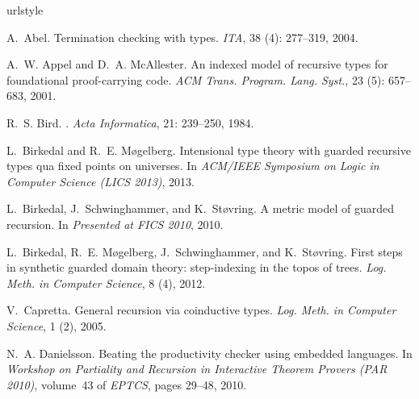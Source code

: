 \documentclass[natbib]{sigplanconf}
\begin{document}
\vfill\eject
\begin{thebibliography}{24}
\providecommand{\natexlab}[1]{#1}
\providecommand{\url}[1]{\texttt{#1}}
\expandafter\ifx\csname urlstyle\endcsname\relax
  \providecommand{\doi}[1]{doi: #1}\else
  \providecommand{\doi}{doi: \begingroup \urlstyle{rm}\Url}\fi

A.~Abel.
\newblock Termination checking with types.
\newblock \emph{ITA}, 38 (4): 277--319, 2004.

A.~W. Appel and D.~A. McAllester.
\newblock An indexed model of recursive types for foundational proof-carrying
  code.
\newblock \emph{ACM Trans. Program. Lang. Syst.}, 23 (5):
  657--683, 2001.

R.~S. Bird.
.
\newblock \emph{Acta Informatica}, 21: 239--250, 1984.

L.~Birkedal and R.~E. M{\o}gelberg.
\newblock Intensional type theory with guarded recursive types qua fixed points
  on universes.
\newblock In \emph{ACM/IEEE Symposium on Logic in Computer Science (LICS
  2013)}, 2013.

L.~Birkedal, J.~Schwinghammer, and K.~St{\o}vring.
\newblock A metric model of guarded recursion.
\newblock In \emph{Presented at FICS 2010}, 2010.

L.~Birkedal, R.~E. M{\o}gelberg, J.~Schwinghammer, and K.~St{\o}vring.
\newblock First steps in synthetic guarded domain theory: step-indexing in the
  topos of trees.
\newblock \emph{Log. Meth. in Computer Science}, 8 (4), 2012.

V.~Capretta.
\newblock General recursion via coinductive types.
\newblock \emph{Log. Meth. in Computer Science}, 1 (2), 2005.

N.~A. Danielsson.
\newblock Beating the productivity checker using embedded languages.
\newblock In \emph{Workshop on Partiality and Recursion in Interactive Theorem
  Provers (PAR 2010)}, volume~43 of \emph{EPTCS}, pages 29--48, 2010.


\end{thebibliography}
\end{document}
